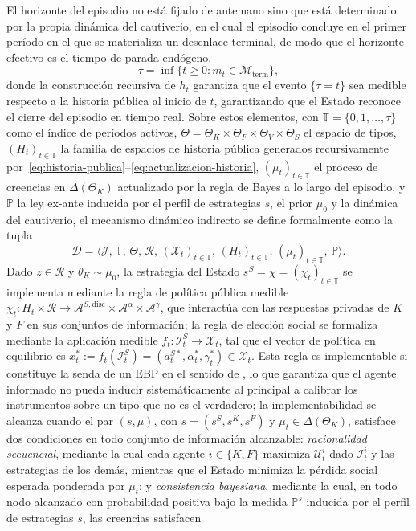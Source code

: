 \documentclass[pdflatex,sn-mathphys-ay]{sn-jnl}
\theoremstyle{thmstyleone}
\theoremstyle{thmstyletwo}
\theoremstyle{thmstylethree}
\newcommand{\Prob}{\mathbb{P}}
\newcommand{\ThetaK}{\Theta_K}
\newcommand{\1}{\mathbf{1}}
\begin{document}
El horizonte del episodio no está fijado de antemano sino que está determinado por la propia dinámica del cautiverio, en el cual el episodio concluye en el primer período en el que se materializa un desenlace terminal, de modo que el horizonte efectivo es el tiempo de parada endógeno.
\begin{equation}
\tau=\inf\{t\geq 0:m_t\in\mathcal{M}_{\mathrm{term}}\},\label{eq:stopping-time}
\end{equation}
donde la construcción recursiva de $h_t$ garantiza que el evento $\{\tau=t\}$ sea medible respecto a la historia pública al inicio de $t$, garantizando que el Estado reconoce el cierre del episodio en tiempo real. Sobre estos elementos, con $\mathbb{T}=\{0,1,\ldots,\tau\}$ como el índice de períodos activos, $\Theta=\ThetaK\times\Theta_F\times\Theta_V\times\Theta_S$ el espacio de tipos, $(H_t)_{t\in\mathbb{T}}$ la familia de espacios de historia pública generados recursivamente por~\eqref{eq:historia-publica}--\eqref{eq:actualizacion-historia}, $(\mu_t)_{t\in\mathbb{T}}$ el proceso de creencias en $\Delta(\ThetaK)$ actualizado por la regla de Bayes a lo largo del episodio, y $\Prob$ la ley ex-ante inducida por el perfil de estrategias $s$, el prior $\mu_0$ y la dinámica del cautiverio, el mecanismo dinámico indirecto se define formalmente como la tupla
\[
\mathcal{D}=\bigl\langle\mathcal{J},\,\mathbb{T},\,\Theta,\,\mathcal{R},\,(\mathcal{X}_t)_{t\in\mathbb{T}},\,(H_t)_{t\in\mathbb{T}},\,(\mu_t)_{t\in\mathbb{T}},\,\Prob\bigr\rangle.
\]
Dado $z\in\mathcal{R}$ y $\theta_K\sim\mu_0$, la estrategia del Estado $s^S=\chi=(\chi_t)_{t\in\mathbb{T}}$ se implementa mediante la regla de política pública medible $\chi_t\colon H_t\times\mathcal{R}\to\mathcal{A}^{S,\mathrm{disc}}\times\mathcal{A}^{\alpha}\times\mathcal{A}^{\gamma}$, que interactúa con las respuestas privadas de $K$ y $F$ en sus conjuntos de información; la regla de elección social se formaliza mediante la aplicación medible $f_t\colon\mathcal{I}_t^S\to\mathcal{X}_t$, tal que el vector de política en equilibrio es $x_t^\ast:=f_t(\mathcal{I}_t^S)=(a_t^{S\ast},\alpha_t^\ast,\gamma_t^\ast)\in\mathcal{X}_t$. Esta regla es implementable si constituye la senda de un EBP en el sentido de \citet{FudenbergTirole1991}, lo que garantiza que el agente informado no pueda inducir sistemáticamente al principal a calibrar los instrumentos sobre un tipo que no es el verdadero; la implementabilidad se alcanza cuando el par $(s,\mu)$, con $s=(s^S,s^K,s^F)$ y $\mu_t\in\Delta(\ThetaK)$, satisface dos condiciones en todo conjunto de información alcanzable: \emph{racionalidad secuencial}, mediante la cual cada agente $i\in\{K,F\}$ maximiza $\mathcal{U}_t^i$ dado $\mathcal{I}_t^i$ y las estrategias de los demás, mientras que el Estado minimiza la pérdida social esperada ponderada por $\mu_t$; y \emph{consistencia bayesiana}, mediante la cual, en todo nodo alcanzado con probabilidad positiva bajo la medida $\Prob^s$ inducida por el perfil de estrategias $s$, las creencias satisfacen
\end{document}

